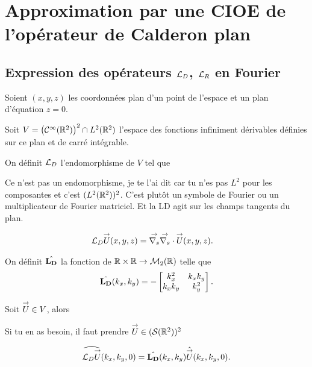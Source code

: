 \section{Approximation par une CIOE de l'opérateur de Calderon plan}

  \subsection[Expression des opérateurs LD, LR en Fourier]{Expression des opérateurs \({\mathcal{L}_D}\), \({\mathcal{L}_R}\) en Fourier}
    \label{sec:plan:hoibc:LD-LR}
    Soient \((x,y,z)\) les coordonnées plan d'un point de l'espace et un plan d'équation \(z=0\).

    Soit \(V = \left(\mathcal{C}^\infty(\mathbb R^2)\right)^2 \cap L^2(\mathbb R^2)\) l'espace des fonctions infiniment dérivables définies sur ce plan et de carré intégrable.

    \begin{defn}
      \label{eq:plan:fourier:LD}
      On définit \({\mathcal{L}_D}\) l'endomorphisme de \(V\) tel que
      \begin{REM}
        Ce n'est pas un endomorphisme, je te l'ai dit car tu n'es pas \(L^2\) pour les composantes et c'est \((L^2(\mathbb R^2))^2\).
        C'est plutôt un symbole de Fourier ou un multiplicateur de Fourier matriciel.
        Et la LD agit sur les champs tangents du plan.
      \end{REM}
      \begin{align*}
        {\mathcal{L}_D} {\overset{\rightarrow}{U}}(x,y,z) & = {\overset{\rightarrow}{\nabla_s}}{} {\overset{\rightarrow}{\nabla_s}} \cdot{} {\overset{\rightarrow}{U}}(x,y,z).
      \end{align*}

      On définit \(\hat{\mathbf{L_D}}\) la fonction de \(\mathbb R\times\mathbb R \rightarrow \mathcal{M}_2(\mathbb R)\) telle que
      \begin{equation*}
        \hat{\mathbf{L_D}}(k_x,k_y) = -
        \begin{bmatrix}
          k_x^2 & k_xk_y
          \\
          k_xk_y & k_y^2
        \end{bmatrix}.
      \end{equation*}
    \end{defn}

    \begin{prop}
      Soit \({\overset{\rightarrow}{U}} \in V\), alors
      \begin{REM}
        Si tu en as besoin, il faut prendre \({\overset{\rightarrow}{U}}\in (\mathcal{S}(\mathbb R^2))^2\)
      \end{REM}
      \begin{equation*}
        \widehat{{\mathcal{L}_D} {\overset{\rightarrow}{U}}} (k_x,k_y,0) = \hat{\mathbf{L_D}}(k_x,k_y) \hat{{\overset{\rightarrow}{U}}}(k_x,k_y,0).
      \end{equation*}
    \end{prop}


